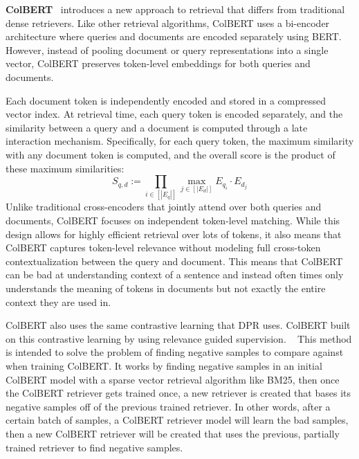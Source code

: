 \documentclass[twocolumn, 10pt]{article}
\begin{document}
\textbf{ColBERT}~\cite{khattab2020colbert} introduces a new approach to retrieval that differs from traditional dense retrievers. Like other retrieval algorithms, ColBERT uses a bi-encoder architecture where queries and documents are encoded separately using BERT. However, instead of pooling document or query representations into a single vector, ColBERT preserves token-level embeddings for both queries and documents. 

Each document token is independently encoded and stored in a compressed vector index. At retrieval time, each query token is encoded separately, and the similarity between a query and a document is computed through a late interaction mechanism. Specifically, for each query token, the maximum similarity with any document token is computed, and the overall score is the product of these maximum similarities:
\begin{equation*}
S_{q,d} := \prod_{i \in [|E_q|]} \max_{j \in [|E_d|]} E_{q_i} \cdot E_{d_j}
\end{equation*}
Unlike traditional cross-encoders that jointly attend over both queries and documents, ColBERT focuses on independent token-level matching. While this design allows for highly efficient retrieval over lots of tokens, it also means that ColBERT captures token-level relevance without modeling full cross-token contextualization between the query and document.
This means that ColBERT can be bad at understanding context of a sentence and instead often times only understands the meaning of tokens in documents but not exactly the entire context they are used in.

ColBERT also uses the same contrastive learning that DPR uses. ColBERT built on this contrastive learning by using relevance guided supervision. ~\cite{khattab2021relevance} This method is intended to solve the problem of finding negative samples to compare against when training ColBERT.
It works by finding negative samples in an initial ColBERT model with a sparse vector retrieval algorithm like BM25, then once the ColBERT retriever gets trained once, a new retriever is created that bases its negative samples off of the previous trained retriever.
In other words, after a certain batch of samples, a ColBERT retriever model will learn the bad samples, then a new ColBERT retriever will be created that uses the previous, partially trained retriever to find negative samples.
\end{document}
